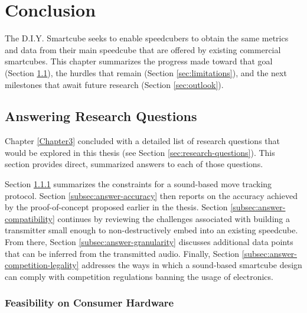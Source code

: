 %

\chapter{Conclusion} 
\label{Chapter8}

The D.I.Y. Smartcube seeks to enable speedcubers to obtain the same
metrics and data from their main speedcube that are offered by existing
commercial smartcubes. This chapter summarizes the progress made toward
that goal (Section \ref{sec:answering-research-questions}), the hurdles
that remain (Section \ref{sec:limitations}), and the next milestones
that await future research (Section \ref{sec:outlook}).


\section{Answering Research Questions}
\label{sec:answering-research-questions}

Chapter \ref{Chapter3} concluded with a detailed list of research
questions that would be explored in this thesis (see Section
\ref{sec:research-questions}). This section provides direct, summarized
answers to each of those questions.

Section \ref{subsec:answer-feasibility} summarizes the constraints for
a sound-based move tracking protocol. Section
\ref{subsec:answer-accuracy} then reports on the accuracy achieved by
the proof-of-concept proposed earlier in the thesis. Section
\ref{subsec:answer-compatibility} continues by reviewing the challenges
associated with building a transmitter small enough to
non-destructively embed into an existing speedcube. From there, Section
\ref{subsec:answer-granularity} discusses additional data points that
can be inferred from the transmitted audio. Finally, Section
\ref{subsec:answer-competition-legality} addresses the ways in which a
sound-based smartcube design can comply with competition regulations
banning the usage of electronics.

\subsection{Feasibility on Consumer Hardware}
\label{subsec:answer-feasibility}

